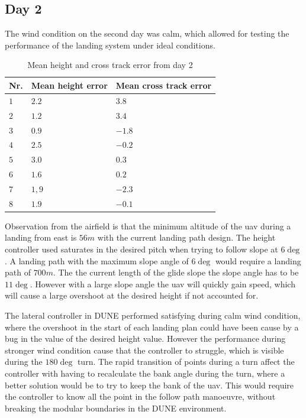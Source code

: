 \subsection{Day 2}
The wind condition on the second day was calm, which allowed for testing the performance of the landing system under ideal conditions.
\begin{table}[H]
\centering
\begin{tabular}{| l | l | l |}
\hline
\textbf{Nr.} 	& \textbf{Mean height error} 	& \textbf{Mean cross track error}  \\ \hline
$1$				& $2.2$							& $3.8$								\\ \hline
$2$				& $1.2$							& $3.4$								\\ \hline
$3$				& $0.9$							& $-1.8$							\\ \hline
$4$				& $2.5$							& $-0.2$							\\ \hline
$5$				& $3.0$							& $0.3$								\\ \hline
$6$				& $1.6$							& $0.2$								\\ \hline
$7$				& $1,9$							& $-2.3$							\\ \hline
$8$				& $1.9$							& $-0.1$							\\ \hline
\end{tabular}
\caption{Mean height and cross track error from day 2}
\end{table}
Observation from the airfield is that the minimum altitude of the \gls{uav} during a landing from east is $56 m$ with the current landing path design. The height controller used saturates in the desired pitch when trying to follow slope at $6 \deg$. A landing path with the maximum slope angle of $6 \deg$ would require a landing path of $700 m$. The the current length of the glide slope the slope angle has to be $11 \deg$. However with a large slope angle the \gls{uav} will quickly gain speed, which will cause a large overshoot at the desired height if not accounted for.

The lateral controller in DUNE performed satisfying during calm wind condition, where the overshoot in the start of each landing plan could have been cause by a bug in the value of the desired height value. However the performance during stronger wind condition cause that the controller to struggle, which is visible during the $180 \deg$ turn. The rapid transition of points during a turn affect the controller with having to recalculate the bank angle during the turn, where a better solution would be to try to keep the bank of the \gls{uav}. This would require the controller to know all the point in the follow path manoeuvre, without breaking the modular boundaries in the DUNE environment.
